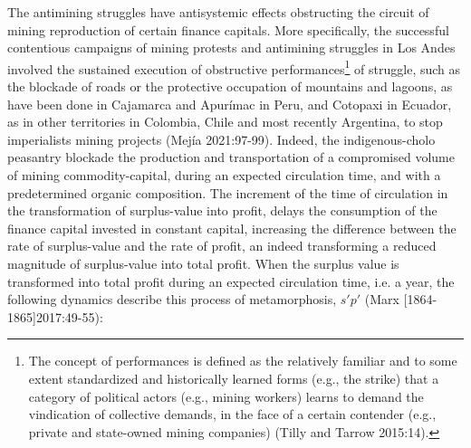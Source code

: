 \documentclass[]{interact}
\theoremstyle{plain}%
\theoremstyle{definition}
\theoremstyle{remark}
\begin{document}
The antimining struggles have antisystemic effects obstructing the circuit of mining reproduction of certain finance capitals. More specifically, the successful contentious campaigns of mining protests and antimining struggles in Los Andes involved the sustained execution of obstructive performances\footnote{The concept of performances is defined as the relatively familiar and to some extent standardized and historically learned forms (e.g., the strike) that a category of political actors (e.g., mining workers) learns to demand the vindication of collective demands, in the face of a certain contender (e.g., private and state-owned mining companies) (Tilly and Tarrow 2015:14).} of struggle, such as the blockade of roads or the protective occupation of mountains and lagoons, as have been done in Cajamarca and Apurímac in Peru, and  Cotopaxi in Ecuador, as in other territories in  Colombia, Chile and most recently Argentina, to stop imperialists mining projects (Mejía 2021:97-99).
Indeed, the indigenous-cholo peasantry blockade the production and transportation of a compromised volume of mining commodity-capital, during an expected circulation time, and with a predetermined organic composition. The increment of the time of circulation in the transformation of surplus-value into profit, delays the consumption of the finance capital invested in constant capital, increasing the difference between the rate of surplus-value and the rate of profit, an indeed transforming a reduced magnitude of surplus-value into total profit. 
When the surplus value is transformed into total profit during an expected circulation time, i.e. a year, the following dynamics describe this process of metamorphosis, 
\(s'\)\(p'\) (Marx [1864-1865]2017:49-55):
\end{document}
